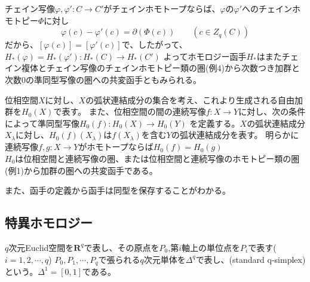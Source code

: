 \documentclass[dvipdfmx,a4paper,11pt]{jsarticle}
\begin{document}
\begin{tcolorbox}[title = 例6]
  チェイン写像$\varphi,\varphi' : C\to C'$がチェインホモトープならば、$\varphi$の$\varphi'$へのチェインホモトピー$\Phi$に対し
  \begin{equation*}
    \varphi(c)-\varphi'(c)=\partial(\Phi(c))\qquad (c\in Z_{q}(C))
  \end{equation*}
  だから、$[\varphi(c)]=[\varphi'(c)]$で、したがって、$H_{*}(\varphi)=H_{*}(\varphi'):H_{*}(C)\to H_{*}(C')$
  よってホモロジー函手$H_{*}$はまたチェイン複体とチェイン写像のチェインホモトピー類の圏(例4)から次数つき加群と次数$0$の準同型写像の圏への共変函手ともみられる。
\end{tcolorbox}

\clearpage

\begin{tcolorbox}[title = 例7]
  位相空間$X$に対し、$X$の弧状連結成分の集合を考え、これより生成される自由加群を$H_{0}(X)$で表す。
  また、位相空間の間の連続写像$f:X\to Y$に対し、次の条件によって準同型写像$H_{0}(f):H_{0}(X)\to H_{0}(Y)$
  を定義する。$X$の弧状連結成分$X_{\lambda}$に対し、$H_{0}(f)(X_{\lambda})$は$f(X_{\lambda})$を含む$Y$の弧状連結成分を表す。
  明らかに連続写像$f,g:X\to Y$がホモトープならば$H_{0}(f)=H_{0}(g)$\\
  $H_{0}$は位相空間と連続写像の圏、または位相空間と連続写像のホモトピー類の圏(例1)から加群の圏への共変函手である。
\end{tcolorbox}
また、函手の定義から函手は同型を保存することがわかる。

\subsection{特異ホモロジー}
$q$次元Euclid空間を$\mathbf{R}^q$で表し、その原点を$P_0$,第$i$軸上の単位点を$P_i$で表す($i=1,2,\cdots,q$)
$P_{0},P_{1},\cdots,P_{q}$で張られる$q$次元単体を$\Delta^q$で表し、(standard q-simplex)という。$\Delta^1=[0,1]$である。
\end{document}
